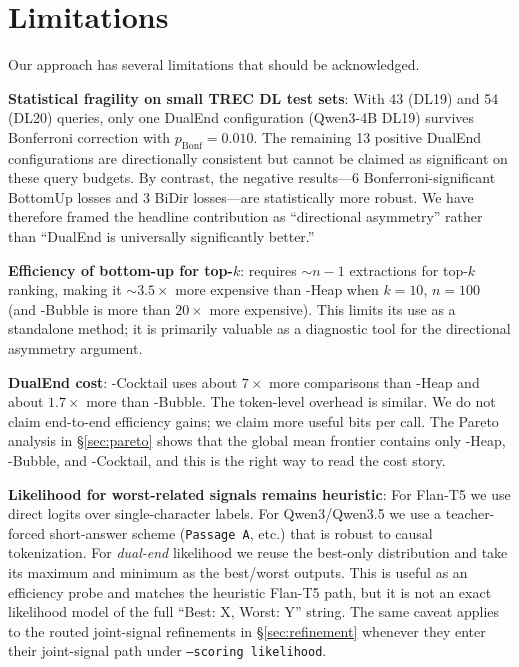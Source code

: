 \section{Limitations}
\label{sec:limitations}

Our approach has several limitations that should be acknowledged.

\textbf{Statistical fragility on small TREC DL test sets}: With 43 (DL19) and 54 (DL20) queries, only one DualEnd configuration (Qwen3-4B DL19) survives Bonferroni correction with $p_\text{Bonf}=0.010$. The remaining 13 positive DualEnd configurations are directionally consistent but cannot be claimed as significant on these query budgets. By contrast, the negative results---6 Bonferroni-significant BottomUp losses and 3 BiDir losses---are statistically more robust. We have therefore framed the headline contribution as ``directional asymmetry'' rather than ``DualEnd is universally significantly better.''

\textbf{Efficiency of bottom-up for top-$k$}: \bottomup{} requires $\sim$$n-1$ extractions for top-$k$ ranking, making it $\sim$$3.5\times$ more expensive than \topdown{}-Heap when $k=10$, $n=100$ (and \bottomup{}-Bubble is more than $20\times$ more expensive). This limits its use as a standalone method; it is primarily valuable as a diagnostic tool for the directional asymmetry argument.

\textbf{DualEnd cost}: \dualend{}-Cocktail uses about $7\times$ more comparisons than \topdown{}-Heap and about $1.7\times$ more than \topdown{}-Bubble. The token-level overhead is similar. We do not claim end-to-end efficiency gains; we claim more useful bits per call. The Pareto analysis in \S\ref{sec:pareto} shows that the global mean frontier contains only \topdown{}-Heap, \topdown{}-Bubble, and \dualend{}-Cocktail, and this is the right way to read the cost story.

\textbf{Likelihood for worst-related signals remains heuristic}: For Flan-T5 we use direct logits over single-character labels. For Qwen3/Qwen3.5 we use a teacher-forced short-answer scheme (\texttt{Passage A}, etc.) that is robust to causal tokenization. For \emph{dual-end} likelihood we reuse the best-only distribution and take its maximum and minimum as the best/worst outputs. This is useful as an efficiency probe and matches the heuristic Flan-T5 path, but it is not an exact likelihood model of the full ``Best: X, Worst: Y'' string. The same caveat applies to the routed joint-signal refinements in \S\ref{sec:refinement} whenever they enter their joint-signal path under \texttt{--scoring likelihood}.

